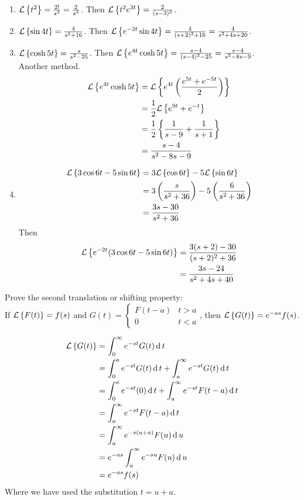 \documentclass[../main-sheet.tex]{subfiles}
\begin{document}
\begin{soln}
    \hfill
    \begin{enumerate}[label={(\alph*)}]
        \item $ \mathcal{L}\left\{ t^2 \right\}=\frac{2!}{s^3}=\frac{2}{s^3}$. Then $ \mathcal{L}\left\{ t^2 e^{3t}\right\}=\frac{2}{(s-3)^3} $.
        \item $ \mathcal{L}\left\{ \sin 4t\right\}=\frac{4}{s^2+16} $. Then $ \mathcal{L}\left\{ e^{-2t} \sin 4t\right\}=\frac{4}{(s+2)^2+16}=\frac{4}{s^2+4s+20}$.
        \item $ \mathcal{L}\left\{ \cosh 5t\right\}=\frac{s}{s^2-25} $. Then $ \mathcal{L}\left\{ e^{4t} \cosh 5t\right\}=\frac{s-4}{(s-4)^2-25}=\frac{s-4}{s^2-8s-9}$.\\
        
        Another method.
        \begin{align*}
            \mathcal{L}\left\{ e^{4t} \cosh 5t\right\}&=\mathcal{L}\left\{ e^{4t}\left( \frac{e^{5t}+e^{-5t}}{2} \right)\right\}\\
            &=\frac{1}{2}\mathcal{L}\left\{ e^{9t}+e^{-t}\right\}\\
            &=\frac{1}{2}\left\{ \frac{1}{s-9}+\frac{1}{s+1}\right\}\\
            &=\frac{s-4}{s^2-8s-9}
        \end{align*}
        \item \begin{align*}
            \mathcal{L}\left\{ 3\cos 6t -5\sin 6t\right\}&=3\mathcal{L}\left\{ \cos 6t\right\}-5\mathcal{L}\left\{ \sin 6t\right\}\\
            &=3\left( \frac{s}{s^2+36} \right)-5\left( \frac{6}{s^2+36} \right)\\
            &=\frac{3s-30}{s^2+36}
        \end{align*}
        Then 
        \begin{align*}
            \mathcal{L}\left\{ e^{-2t} (3\cos 6t - 5\sin 6t)\right\}&=\frac{3(s+2)-30}{(s+2)^2+36}\\
            &=\frac{3s-24}{s^2+4s+40}
        \end{align*}
    \end{enumerate}
\end{soln}
\begin{prob}
    Prove the second translation or shifting property:\\
    If $ \mathcal{L}\left\{ F(t)\right\}=f(s) $ and $ G(t)=\begin{cases}
        F(t-a) & t>a\\
        0 & t<a
    \end{cases} $, then $ \mathcal{L}\left\{ G(t)\right\}=e^{-as}f(s) $.
\end{prob}
\begin{soln}
    \begin{align*}
        \mathcal{L}\left\{ G(t)\right\}&=\int_0^\infty e^{-st}G(t)\,\mathrm{d}\, t\\
        &=\int_0^a e^{-st}G(t)\,\mathrm{d}\, t+\int_a^\infty e^{-st}G(t)\,\mathrm{d}\, t\\
        &=\int_0^a e^{-st}(0)\,\mathrm{d}\, t+\int_a^\infty e^{-st}F(t-a)\,\mathrm{d}\, t\\
        &=\int_a^\infty e^{-st}F(t-a)\,\mathrm{d}\, t\\
        &=\int_a^\infty e^{-s(u+a)}F(u)\,\mathrm{d}\, u\\
        &=e^{-as}\int_a^\infty e^{-su}F(u)\,\mathrm{d}\, u\\
        &=e^{-as}f(s)
    \end{align*}
    Where we have used the substitution $ t=u+a $.
\end{soln}
\end{document}
